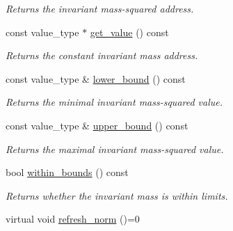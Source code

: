 \begin{DoxyCompactItemize}
\begin{DoxyCompactList}\small\item\em Returns the invariant mass-\/squared address. \end{DoxyCompactList}\item 
\hypertarget{a00577_a6528e82cba250592880a15ddbbadc525}{}const value\+\_\+type $\ast$ \hyperlink{a00577_a6528e82cba250592880a15ddbbadc525}{get\+\_\+value} () const \label{a00577_a6528e82cba250592880a15ddbbadc525}

\begin{DoxyCompactList}\small\item\em Returns the constant invariant mass address. \end{DoxyCompactList}\item 
\hypertarget{a00577_ab8cd4fc5bdcf7a9cee6ad543ab0e243d}{}const value\+\_\+type \& \hyperlink{a00577_ab8cd4fc5bdcf7a9cee6ad543ab0e243d}{lower\+\_\+bound} () const \label{a00577_ab8cd4fc5bdcf7a9cee6ad543ab0e243d}

\begin{DoxyCompactList}\small\item\em Returns the minimal invariant mass-\/squared value. \end{DoxyCompactList}\item 
\hypertarget{a00577_a036608f7b5f8d354edfeab58a6505903}{}const value\+\_\+type \& \hyperlink{a00577_a036608f7b5f8d354edfeab58a6505903}{upper\+\_\+bound} () const \label{a00577_a036608f7b5f8d354edfeab58a6505903}

\begin{DoxyCompactList}\small\item\em Returns the maximal invariant mass-\/squared value. \end{DoxyCompactList}\item 
\hypertarget{a00577_a986780bdd304c01e706af88a2add0ebe}{}bool \hyperlink{a00577_a986780bdd304c01e706af88a2add0ebe}{within\+\_\+bounds} () const \label{a00577_a986780bdd304c01e706af88a2add0ebe}

\begin{DoxyCompactList}\small\item\em Returns whether the invariant mass is within limits. \end{DoxyCompactList}\item 
\hypertarget{a00577_a0cfa8490f4dfee7fd9b66707956eb90c}{}virtual void \hyperlink{a00577_a0cfa8490f4dfee7fd9b66707956eb90c}{refresh\+\_\+norm} ()=0\label{a00577_a0cfa8490f4dfee7fd9b66707956eb90c}


\end{DoxyCompactItemize}
